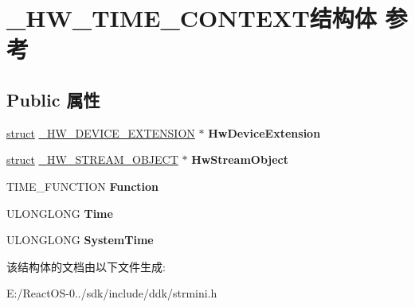 \hypertarget{struct___h_w___t_i_m_e___c_o_n_t_e_x_t}{}\section{\+\_\+\+H\+W\+\_\+\+T\+I\+M\+E\+\_\+\+C\+O\+N\+T\+E\+X\+T结构体 参考}
\label{struct___h_w___t_i_m_e___c_o_n_t_e_x_t}
\subsection*{Public 属性}
\begin{DoxyCompactItemize}
\item 
\mbox{\label{struct___h_w___t_i_m_e___c_o_n_t_e_x_t_a78b47fccadfb633e431bb9d678a128ff}} 
\hyperlink{interfacestruct}{struct} \hyperlink{struct___h_w___d_e_v_i_c_e___e_x_t_e_n_s_i_o_n}{\+\_\+\+H\+W\+\_\+\+D\+E\+V\+I\+C\+E\+\_\+\+E\+X\+T\+E\+N\+S\+I\+ON} $\ast$ {\bfseries Hw\+Device\+Extension}
\item 
\mbox{\label{struct___h_w___t_i_m_e___c_o_n_t_e_x_t_a9ea6c693445e71577efaff4937c2a89d}} 
\hyperlink{interfacestruct}{struct} \hyperlink{struct___h_w___s_t_r_e_a_m___o_b_j_e_c_t}{\+\_\+\+H\+W\+\_\+\+S\+T\+R\+E\+A\+M\+\_\+\+O\+B\+J\+E\+CT} $\ast$ {\bfseries Hw\+Stream\+Object}
\item 
\mbox{\label{struct___h_w___t_i_m_e___c_o_n_t_e_x_t_ab7f87953717159e124c46d831bd398cc}} 
T\+I\+M\+E\+\_\+\+F\+U\+N\+C\+T\+I\+ON {\bfseries Function}
\item 
\mbox{\label{struct___h_w___t_i_m_e___c_o_n_t_e_x_t_a79f7934f7a2c04d68a598428cc16382c}} 
U\+L\+O\+N\+G\+L\+O\+NG {\bfseries Time}
\item 
\mbox{\label{struct___h_w___t_i_m_e___c_o_n_t_e_x_t_af26f23e6d48b570d5c481c7668c9583b}} 
U\+L\+O\+N\+G\+L\+O\+NG {\bfseries System\+Time}
\end{DoxyCompactItemize}


该结构体的文档由以下文件生成\+:\begin{DoxyCompactItemize}
\item 
E\+:/\+React\+O\+S-\/0../sdk/include/ddk/strmini.\+h\end{DoxyCompactItemize}
